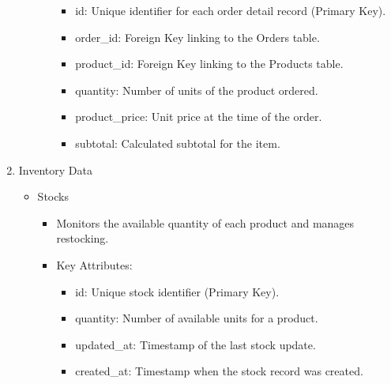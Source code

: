 \documentclass{llncs}
\begin{document}
\begin{enumerate}
\begin{itemize}
\begin{itemize}
                              \begin{itemize}
                                  \item id: Unique identifier for each order detail record (Primary Key).
                                  \item order\_id: Foreign Key linking to the Orders table.
                                  \item product\_id: Foreign Key linking to the Products table.
                                  \item quantity: Number of units of the product ordered.
                                  \item product\_price: Unit price at the time of the order.
                                  \item subtotal: Calculated subtotal for the item.

                              \end{itemize}
                    \end{itemize}
          \end{itemize}

    \item Inventory Data
          \begin{itemize}
              \item Stocks
                    \begin{itemize}
                        \item Monitors the available quantity of each product and manages restocking.
                        \item Key Attributes:
                              \begin{itemize}
                                  \item id: Unique stock identifier (Primary Key).
                                  \item quantity: Number of available units for a product.
                                  \item updated\_at: Timestamp of the last stock update.
                                  \item created\_at: Timestamp when the stock record was created.


\end{itemize}
\end{itemize}
\end{itemize}
\end{enumerate}
\end{document}
